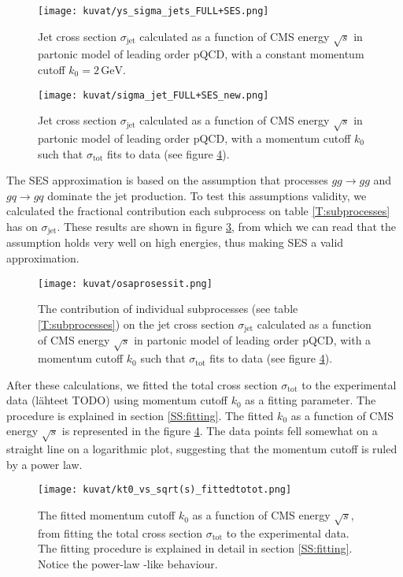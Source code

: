 \documentclass[a4paper, twoside, english, 12pt]{article}
\begin{document}
\begin{figure}[h]
	\centering
	\texttt{[image: kuvat/ys\_sigma\_jets\_FULL+SES.png]}
	\caption{Jet cross section $\sigma_{\text{jet}}$ calculated as a function of CMS energy $\sqrt{s}$ in partonic model of leading order pQCD, with a constant momentum cutoff $k_0 = 2\,\text{GeV}$.}
	\label{F:FULL_vs_SES_const_kt0}
\end{figure}

\begin{figure}[h]
	\centering
	\texttt{[image: kuvat/sigma\_jet\_FULL+SES\_new.png]}
	\caption{Jet cross section $\sigma_{\text{jet}}$ calculated as a function of CMS energy $\sqrt{s}$ in partonic model of leading order pQCD, with a momentum cutoff $k_0$ such that $\sigma_{\text{tot}}$ fits to data (see figure \ref{F:kt0_fitting}).}
	\label{F:FULL_vs_SES}
\end{figure}

The SES approximation is based on the assumption that processes $gg\rightarrow gg$ and $gq\rightarrow gq$ dominate the jet production. To test this assumptions validity, we calculated the fractional contribution each subprocess on table \ref{T:subprocesses} has on $\sigma_{\text{jet}}$. These results are shown in figure \ref{F:subprocess_contribution}, from which we can read that the assumption holds very well on high energies, thus making SES a valid approximation.

\begin{figure}[h]
	\centering
	\texttt{[image: kuvat/osaprosessit.png]}
	\caption{The contribution of individual subprocesses (see table \ref{T:subprocesses}) on the jet cross section $\sigma_{\text{jet}}$ calculated as a function of CMS energy $\sqrt{s}$ in partonic model of leading order pQCD, with a momentum cutoff $k_0$ such that $\sigma_{\text{tot}}$ fits to data (see figure \ref{F:kt0_fitting}).}
	\label{F:subprocess_contribution}
\end{figure}

After these calculations, we fitted the total cross section $\sigma_{\text{tot}}$ to the experimental data (lähteet TODO) using momentum cutoff $k_0$ as a fitting parameter. The procedure is explained in section \ref{SS:fitting}. The fitted $k_0$ as a function of CMS energy $\sqrt{s}$ is represented in the figure \ref{F:kt0_fitting}. The data points fell somewhat on a straight line on a logarithmic plot, suggesting that the momentum cutoff is ruled by a power law.

\begin{figure}[h]
	\centering
	\texttt{[image: kuvat/kt0\_vs\_sqrt(s)\_fittedtotot.png]}
	\caption{The fitted momentum cutoff $k_0$ as a function of CMS energy $\sqrt{s}$, from fitting the total cross section $\sigma_{\text{tot}}$ to the experimental data. The fitting procedure is explained in detail in section \ref{SS:fitting}. Notice the power-law -like behaviour.}
	\label{F:kt0_fitting}
\end{figure}
\end{document}
